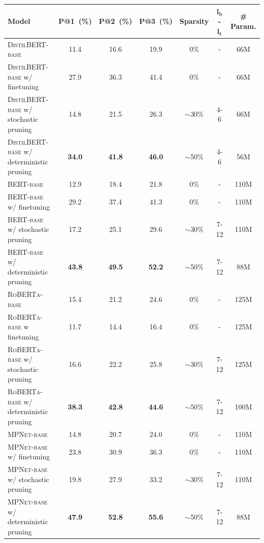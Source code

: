 \begin{table}[t!]
	\centering
	\scriptsize
	\begin{tabular}{l|ccc|c|c|c}
		\toprule
		\textbf{Model} & \textbf{P@1~(\%)} & \textbf{P@2~(\%)} & \textbf{P@3~(\%)} & \textbf{Sparsity}  & $\bm{l_b}$-$\bm{l_t}$ & \textbf{\# Param.}\\
		\midrule
		\textsc{DistilBERT-base} & 11.4 &16.6  &19.9  & 0\% & - & 66M\\
		\textsc{DistilBERT-base} w/ finetuning &27.9  &36.3  &41.4  & 0\% & - & 66M\\
		\textsc{DistilBERT-base} w/ stochastic pruning & 14.8 &21.5 &26.3 & $\sim$30\% & 4-6 &66M \\
		\textsc{DistilBERT-base} w/ deterministic pruning & \textbf{34.0} &\textbf{41.8} &\textbf{46.0} & $\sim$50\% & 4-6 &56M \\
		\midrule
		\textsc{BERT-base} & 12.9 & 18.4  & 21.8 & 0\% & -  &110M\\
		\textsc{BERT-base} w/ finetuning &29.2  &37.4   &41.3  & 0\% & -  &110M\\
		\textsc{BERT-base} w/ stochastic pruning & 17.2 & 25.1  & 29.6  & $\sim$30\% & 7-12 & 110M\\
		\textsc{BERT-base} w/ deterministic pruning & \textbf{43.8} & \textbf{49.5}  & \textbf{52.2}  & $\sim$50\% & 7-12 & 88M\\
		\midrule
		\textsc{RoBERTa-base} & 15.4 & 21.2  & 24.6 & 0\% & - &125M  \\
		\textsc{RoBERTa-base} w finetuning &11.7  &14.4  &16.4 & 0\% & - &125M  \\
		\textsc{RoBERTa-base} w/ stochastic pruning &16.6  &22.2   &25.8   & $\sim$30\% & 7-12 & 125M\\
		\textsc{RoBERTa-base} w/ deterministic pruning &\textbf{38.3}  &\textbf{42.8}   &\textbf{44.6}   & $\sim$50\% & 7-12 &100M \\
		\midrule
		\textsc{MPNet-base}& 14.8  &20.7   &24.0 & 0\%  & - & 110M\\
		\textsc{MPNet-base} w/ finetuning &23.8   &30.9   &36.3 & 0\%  & - & 110M\\
		\textsc{MPNet-base} w/ stochastic pruning &19.8  &27.9   &33.2  & $\sim$30\% & 7-12  & 110M\\
		\textsc{MPNet-base} w/ deterministic pruning & \textbf{47.9} &\textbf{52.8}   &\textbf{55.6}  & $\sim$50\% & 7-12 &88M \\

\end{tabular}
\end{table}
